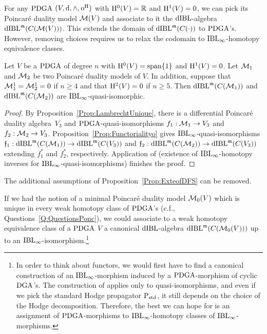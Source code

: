 \documentclass[\MainFolder/Text.tex]{subfiles}
\begin{document}
For any $\mathrm{PDGA}$ $(V,\dd,\wedge,\mathrm{o}^{\mathrm{H}})$ with $\mathrm{H}^0(V)=\mathbb{R}$ and $\mathrm{H}^1(V)=0$, we can pick its Poincar\'e duality model $\mathcal{M}(V)$ and associate to it the $\mathrm{dIBL}$-algebra $\mathrm{dIBL}^{\mathfrak{m}}(C(\mathcal{M}(V)))$. This extends the domain of $\mathrm{dIBL}^{\mathfrak{m}}(C(\cdot))$ to $\mathrm{PDGA}$'s. However, removing choices requires us to relax the codomain to $\mathrm{IBL}_\infty$-homotopy equivalence classes.

\begin{Proposition}\label{Prop:ExteofDFS}
Let $V$ be a $\mathrm{PDGA}$ of degree $n$ with $\mathrm{H}^0(V)=\mathrm{span}\{1\}$ and $\mathrm{H}^1(V)=0$.
Let $\mathcal{M}_1$ and $\mathcal{M}_2$ be two Poincar\'e duality models of $V$.
In addition, suppose that $\mathcal{M}_1^1 = \mathcal{M}_2^1 = 0$ if $n\ge 4$ and that $\mathrm{H}^2(V)=0$ if $n\ge 5$.
Then $\mathrm{dIBL}^{\mathfrak{m}}(C(\mathcal{M}_1))$ and $\mathrm{dIBL}^{\mathfrak{m}}(C(\mathcal{M}_2))$ are $\mathrm{IBL}_\infty$-quasi-isomorphic.
\end{Proposition}
\begin{proof}
By Proposition~\ref{Prop:LambrechtUnique}, there is a differential Poincar\'e duality algebra~$V_3$ and $\mathrm{PDGA}$-quasi-isomorphisms $f_1: \mathcal{M}_1\rightarrow V_3$ and $f_2: \mathcal{M}_2\rightarrow V_3$.
Proposition~\ref{Prop:Functorialityo} gives $\mathrm{IBL}_\infty$-quasi-isomorphisms $\mathfrak{f}_1: \mathrm{dIBL}^{\mathfrak{m}}(C(\mathcal{M}_1)) \rightarrow \mathrm{dIBL}^{\mathfrak{m}}(C(V_3))$ and $\mathfrak{f}_2: \mathrm{dIBL}^{\mathfrak{m}}(C(\mathcal{M}_2)) \rightarrow \mathrm{dIBL}^{\mathfrak{m}}(C(V_3))$ extending $f_1^*$ and $f_2^*$, respectively. Application of \cite[Theorem 1.2]{Cieliebak2015} (existence of $\mathrm{IBL}_\infty$-homotopy inverses for $\mathrm{IBL}_\infty$-quasi-isomorphisms) finishes the proof.
\end{proof}

\begin{Conjecture}\label{Conj:UniqModelFollow}
	The additional assumptions of Proposition~\ref{Prop:ExteofDFS} can be removed.
\end{Conjecture}


If we had the notion of a minimal Poincar\'e duality model $\mathcal{M}_0(V)$ which is unique in every weak homotopy class of $\mathrm{PDGA}$'s (c.f., Questions~\ref{Q:QuestionsPonc}), we could associate to a weak homotopy equivalence class of a $\mathrm{PDGA}$ $V$ a canonical $\mathrm{dIBL}$-algebra $\mathrm{dIBL}^{\mathfrak{m}}(C(\mathcal{M}_0(V)))$ up to an $\mathrm{IBL}_\infty$-isomorphism.\footnote{In order to think about functors, we would first have to find a canonical construction of an $\mathrm{IBL}_\infty$-morphism induced by a $\mathrm{PDGA}$-morphism of cyclic $\mathrm{DGA}$'s. The construction of \cite[Section~11]{Cieliebak2015} applies only to quasi-isomorphisms, and even if we pick the standard Hodge propagator $\mathrm{P}_{\mathrm{std}}$, it still depends on the choice of the Hodge decomposition. Therefore, the best we can hope for is an assignment of $\mathrm{PDGA}$-morphisms to $\mathrm{IBL}_\infty$-homotopy classes of $\mathrm{IBL}_\infty$-morphisms.}
\end{document}
